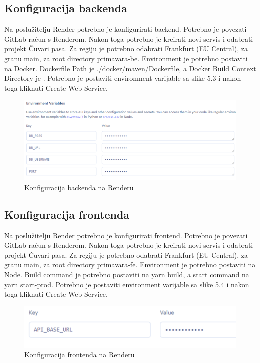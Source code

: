 			\subsection{Konfiguracija backenda}
			
			
			Na poslužitelju Render potrebno je konfigurirati backend. Potrebno je povezati GitLab račun s Renderom. Nakon toga potrebno je kreirati novi servis i odabrati projekt Čuvari pasa. Za regiju je potrebno odabrati Frankfurt (EU Central), za granu main, za root directory primavara-be. Environment je potrebno postaviti na Docker. Dockerfile Path je ./docker/maven/Dockerfile, a Docker Build Context Directory je . Potrebno je postaviti environment varijable sa slike 5.3 i nakon toga kliknuti Create Web Service.
			
			\begin{figure}[H]
				\centering
				\includegraphics[width=12cm]{slike/konfiguracijaBackenda}
				\caption{Konfiguracija backenda na Renderu}
				\label{fig:Backend-Render}
			\end{figure}
			
			\subsection{Konfiguracija frontenda}
			
			
			Na poslužitelju Render potrebno je konfigurirati frontend. Potrebno je povezati GitLab račun s Renderom. Nakon toga potrebno je kreirati novi servis i odabrati projekt Čuvari pasa. Za regiju je potrebno odabrati Frankfurt (EU Central), za granu main, za root directory primavara-fe. Environment je potrebno postaviti na Node. Build command je potrebno postaviti na yarn build, a start command na yarn start-prod. Potrebno je postaviti environment varijable sa slike 5.4 i nakon toga kliknuti Create Web Service.
			
			\begin{figure}[H]
				\centering
				\includegraphics[width=12cm]{slike/konfiguracijaFrontenda}
				\caption{Konfiguracija frontenda na Renderu}
				\label{fig:Frontend-Render}
			\end{figure}
			\eject 